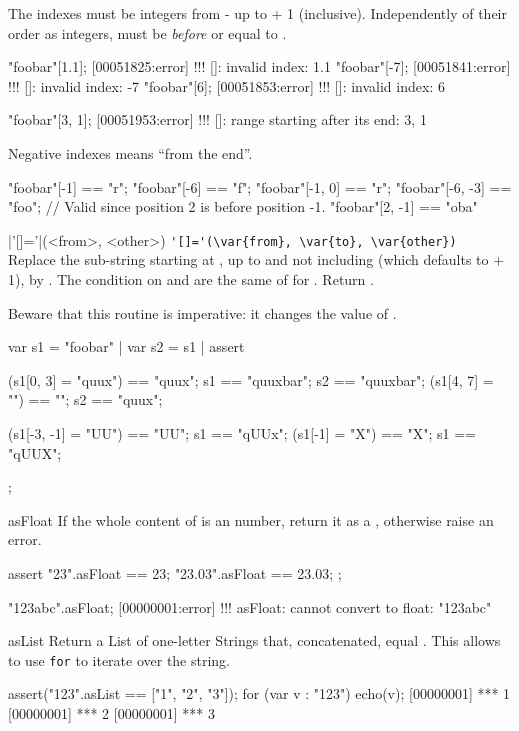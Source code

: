 \begin{urbiscriptapi}
The indexes must be integers from - up to  + 1
(inclusive).  Independently of their order as integers,  must be
\emph{before} or equal to .

\begin{urbiscript}
"foobar"[1.1];
[00051825:error] !!! []: invalid index: 1.1
"foobar"[-7];
[00051841:error] !!! []: invalid index: -7
"foobar"[6];
[00051853:error] !!! []: invalid index: 6

"foobar"[3, 1];
[00051953:error] !!! []: range starting after its end: 3, 1
\end{urbiscript}

Negative indexes means ``from the end''.

\begin{urbiassert}
"foobar"[-1] == "r";
"foobar"[-6] == "f";
"foobar"[-1, 0] == "r";
"foobar"[-6, -3] == "foo";
// Valid since position 2 is before position -1.
"foobar"[2, -1] == "oba"
\end{urbiassert}


\item|'[]='|(<from>, <other>)%
  \lstinline|'[]='(\var{from}, \var{to}, \var{other})|\\
  Replace the sub-string starting at , up to and not including
   (which defaults to  + 1), by .  The condition
  on  and  are the same of for .  Return
  .

  Beware that this routine is imperative: it changes the value of
  \this.
\begin{urbiscript}
var s1 = "foobar" | var s2 = s1 |
assert
{
  (s1[0, 3] = "quux") == "quux";
  s1 == "quuxbar";
  s2 == "quuxbar";
  (s1[4, 7] = "") == "";
  s2 == "quux";

  (s1[-3, -1] = "UU") == "UU";
  s1 == "qUUx";
  (s1[-1] = "X") == "X";
  s1 == "qUUX";
};
\end{urbiscript}


\item[asFloat] If the whole content of \this is an number, return it as a
  , otherwise raise an error.
\begin{urbiscript}
assert
{
     "23".asFloat == 23;
  "23.03".asFloat == 23.03;
};

"123abc".asFloat;
[00000001:error] !!! asFloat: cannot convert to float: "123abc"
\end{urbiscript}


\item[asList]
  Return a List of one-letter Strings that, concatenated, equal
  \this.  This allows to use \lstinline|for| to iterate
  over the string.
\begin{urbiscript}
assert("123".asList == ["1", "2", "3"]);
for (var v : "123")
  echo(v);
[00000001] *** 1
[00000001] *** 2
[00000001] *** 3
\end{urbiscript}



\end{urbiscriptapi}
